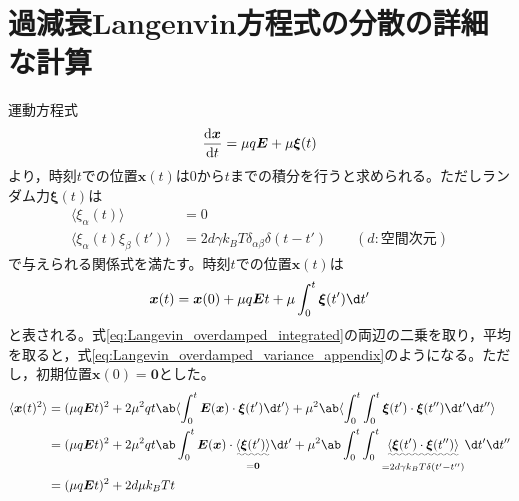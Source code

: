 \documentclass[autodetect-engine,dvi=dvipdfmx,a4paper,ja=standard,oneside,openany,11pt]{bxjsbook}
\begin{document}
\section{過減衰Langenvin方程式の分散の詳細な計算}
\label{sec:Langevin_cal}
運動方程式
\begin{equation}
  \odv{\bm{x}}{t}=\mu q\bm{E}+\mu\bm{\xi}(t)
  \label{eq:Langevin_overdamped}
\end{equation}
より，時刻$t$での位置$\bm{x}(t)$は0から$t$までの積分を行うと求められる。ただしランダム力$\bm{\xi}(t)$は
\begin{equation}
  \begin{split}
    \langle\xi_\alpha(t)\rangle              & =0                                                                       \\
    \langle\xi_\alpha(t)\xi_\beta(t')\rangle & =2d\gamma k_B T\delta_{\alpha\beta}\delta(t-t') \qquad (d:\mathrm{空間次元})
  \end{split}
  \label{eq:random_force}
\end{equation}
で与えられる関係式を満たす。時刻$t$での位置$\bm{x}(t)$は
\begin{equation}
  \bm{x}(t)=\bm{x}(0)+\mu q\bm{E}t+\mu\int_0^t\bm{\xi}(t')\d t'
  \label{eq:Langevin_overdamped_integrated}
\end{equation}
と表される。式\ref{eq:Langevin_overdamped_integrated}の両辺の二乗を取り，平均を取ると，式\eqref{eq:Langevin_overdamped_variance_appendix}のようになる。ただし，初期位置$\bm{x}(0)=\bm{0}$とした。
\begin{equation}
  \begin{split}
    \langle\bm{x}(t)^2\rangle & =(\mu q \bm{E} t)^2+2\mu^2 q t\ab\langle\int_{0}^{t}\bm{E}(\bm{x})\cdot\bm{\xi}(t') \d t'\rangle+\mu^2\ab\langle\int_{0}^{t}\int_{0}^{t}\bm{\xi}(t')\cdot
    \bm{\xi}(t'') \d t' \d t''\rangle                                                                                                                                                                                                                                 \\
                              & =(\mu q \bm{E} t)^2+2\mu^2 q t\ab\int_{0}^{t}\bm{E}(\bm{x})\cdot\underset{=\bm{0}}{\uwave{\langle\bm{\xi}(t')\rangle}} \d t'+\mu^2\ab\int_{0}^{t}\int_{0}^{t}\underset{=2d\gamma k_B T\delta(t'-t'')}{\uwave{\langle\bm{\xi}(t')\cdot
    \bm{\xi}(t'')\rangle}} \d t' \d t''                                                                                                                                                                                                                               \\
                              & =(\mu q \bm{E} t)^2+2d\mu k_B T t                                                                                                                                                                                                     \\
  \end{split}
  \label{eq:Langevin_overdamped_variance_appendix}
\end{equation}
\end{document}
